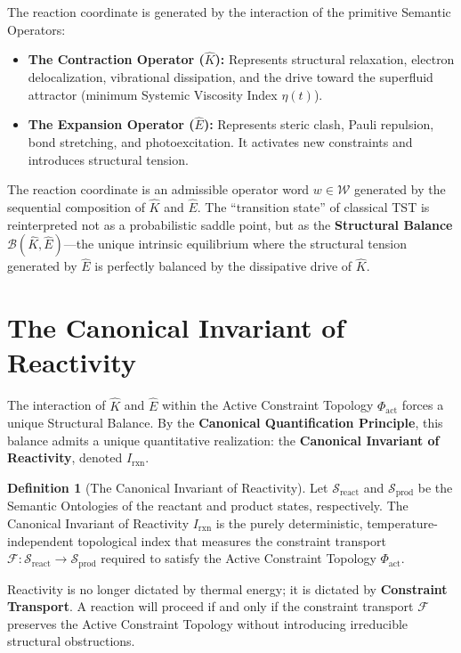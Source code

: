 \documentclass[11pt,openany]{extbook}
\theoremstyle{plain}
\theoremstyle{definition}
\newtheorem{definition}{Definition}[chapter]
\begin{document}
The reaction coordinate is generated by the interaction of the primitive Semantic Operators:
\begin{itemize}
    \item \textbf{The Contraction Operator ($\hat{K}$):} Represents structural relaxation, electron delocalization, vibrational dissipation, and the drive toward the superfluid attractor (minimum Systemic Viscosity Index $\eta(t)$).
    \item \textbf{The Expansion Operator ($\hat{E}$):} Represents steric clash, Pauli repulsion, bond stretching, and photoexcitation. It activates new constraints and introduces structural tension.
\end{itemize}

The reaction coordinate is an admissible operator word $w \in \mathcal{W}$ generated by the sequential composition of $\hat{K}$ and $\hat{E}$. The ``transition state'' of classical TST is reinterpreted not as a probabilistic saddle point, but as the \textbf{Structural Balance} $\mathcal{B}(\hat{K}, \hat{E})$---the unique intrinsic equilibrium where the structural tension generated by $\hat{E}$ is perfectly balanced by the dissipative drive of $\hat{K}$.

\section{The Canonical Invariant of Reactivity}

The interaction of $\hat{K}$ and $\hat{E}$ within the Active Constraint Topology $\Phi_{\mathrm{act}}$ forces a unique Structural Balance. By the \textbf{Canonical Quantification Principle}, this balance admits a unique quantitative realization: the \textbf{Canonical Invariant of Reactivity}, denoted $I_{\mathrm{rxn}}$.

\begin{definition}[The Canonical Invariant of Reactivity]
Let $\mathcal{S}_{\mathrm{react}}$ and $\mathcal{S}_{\mathrm{prod}}$ be the Semantic Ontologies of the reactant and product states, respectively. The Canonical Invariant of Reactivity $I_{\mathrm{rxn}}$ is the purely deterministic, temperature-independent topological index that measures the constraint transport $\mathcal{F}: \mathcal{S}_{\mathrm{react}} \to \mathcal{S}_{\mathrm{prod}}$ required to satisfy the Active Constraint Topology $\Phi_{\mathrm{act}}$.
\end{definition}

Reactivity is no longer dictated by thermal energy; it is dictated by \textbf{Constraint Transport}. A reaction will proceed if and only if the constraint transport $\mathcal{F}$ preserves the Active Constraint Topology without introducing irreducible structural obstructions.
\end{document}
